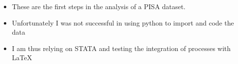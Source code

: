 \documentclass{beamer}
\begin{document}
\begin{frame}
\begin{itemize}
\item These are the first steps in the analysis of a PISA dataset.
\item Unfortunately I was not successful in using python to import and code the data
\item I am thus relying on STATA and testing the integration of processes with LaTeX
\end{itemize}
\end{frame}

\begin{frame}
\begin{center}

\end{center}


\end{frame}
\end{document}
